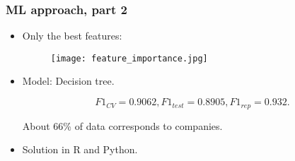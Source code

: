 \documentclass{beamer}
\begin{document}
\begin{frame}[fragile]
\frametitle{ML approach, part 2}
\begin{itemize}
	\item Only the best features:
	
\begin{figure}
\centering
\texttt{[image: feature\_importance.jpg]}
\end{figure}
	
	\item Model: Decision tree. 
	
	$$F1_{CV} = 0.9062, F1_{test} = 0.8905, F1_{rep} = 0.932.$$
	
	About 66\% of data corresponds to companies.
	
	\item Solution in R and Python.
	
\end{itemize}
\end{frame}
\end{document}
